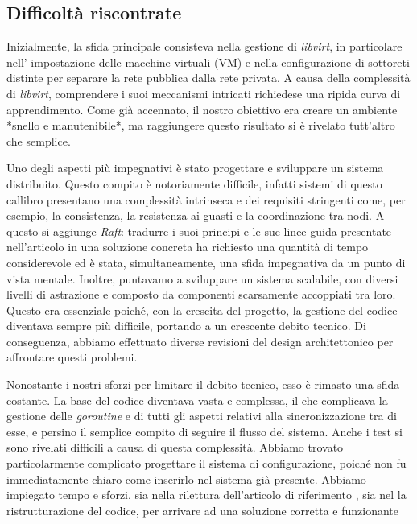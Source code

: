 \subsection{Difficoltà riscontrate}
Inizialmente, la sfida principale consisteva nella gestione di \textit{libvirt}, in particolare nell'
impostazione delle macchine virtuali (VM) e nella configurazione di sottoreti distinte per separare la rete 
pubblica dalla rete privata. A causa della complessità di \textit{libvirt}, comprendere i suoi meccanismi 
intricati richiedese una ripida curva di apprendimento. Come già accennato, il nostro obiettivo era creare un 
ambiente *snello e manutenibile*, ma raggiungere questo risultato si è rivelato tutt'altro che semplice.

Uno degli aspetti più impegnativi è stato progettare e sviluppare un sistema distribuito. Questo compito è 
notoriamente difficile, infatti sistemi di questo callibro presentano una complessità 
intrinseca e dei requisiti stringenti come, per esempio, la consistenza, la resistenza ai guasti e la 
coordinazione tra nodi. A questo si aggiunge \textit{Raft}:
tradurre i suoi principi e le sue linee guida presentate nell'articolo \cite{1} in una soluzione 
concreta ha richiesto una quantità di tempo considerevole ed è stata, simultaneamente, una sfida impegnativa da 
un punto di vista mentale.
Inoltre, puntavamo a sviluppare un sistema scalabile, con diversi livelli di astrazione e composto da 
componenti scarsamente accoppiati tra loro. Questo era essenziale poiché, 
con la crescita del progetto, la gestione del codice diventava sempre più difficile, portando a un crescente 
debito tecnico. Di conseguenza, abbiamo effettuato diverse revisioni del design architettonico per affrontare 
questi problemi.

Nonostante i nostri sforzi per limitare il debito tecnico, esso è rimasto una sfida costante. La base del codice 
diventava vasta e complessa, il che complicava la gestione delle \textit{goroutine} e di tutti gli aspetti 
relativi alla sincronizzazione tra di esse, e persino il semplice compito di seguire il flusso del sistema. 
Anche i test si sono rivelati difficili a causa di questa complessità. Abbiamo trovato particolarmente 
complicato progettare il sistema di configurazione, poiché non fu immediatamente chiaro come inserirlo nel 
sistema già presente. Abbiamo impiegato tempo e sforzi, sia nella rilettura dell'articolo di riferimento \cite{1}, sia nel
la ristrutturazione del codice, per arrivare ad una soluzione corretta e funzionante

